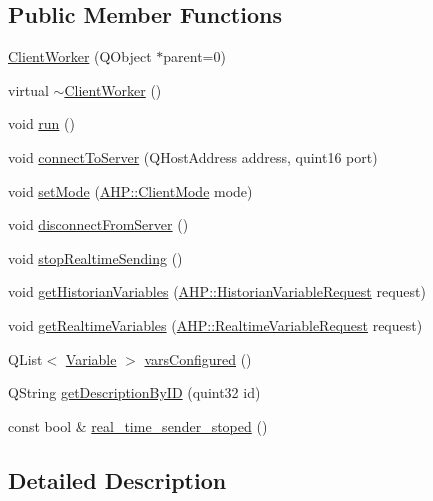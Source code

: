 \subsection*{Public Member Functions}
\begin{DoxyCompactItemize}
\item 
\hyperlink{class_client_worker_ad223b84d9ccc00853084642dbc4aa9af}{Client\+Worker} (Q\+Object $\ast$parent=0)
\item 
virtual \hyperlink{class_client_worker_a1660a6452f026a2885c6d282a0f5fa01}{$\sim$\+Client\+Worker} ()
\item 
void \hyperlink{class_client_worker_a70384799acf30a83743de2b68d942e58}{run} ()
\item 
void \hyperlink{class_client_worker_a9932072c09ca5961278629f0db6069d4}{connect\+To\+Server} (Q\+Host\+Address address, quint16 port)
\item 
void \hyperlink{class_client_worker_a98bac5e42243a0aa95ff67f2e7bd2edb}{set\+Mode} (\hyperlink{namespace_a_h_p_a130fcb3fee4e9ea58cc099ea76b62884}{A\+H\+P\+::\+Client\+Mode} mode)
\item 
void \hyperlink{class_client_worker_af23bbf2e8ea18946c39d61d2c93ced6b}{disconnect\+From\+Server} ()
\item 
void \hyperlink{class_client_worker_ad0f43610dc93ba270b945bace545dbbf}{stop\+Realtime\+Sending} ()
\item 
void \hyperlink{class_client_worker_add9dfbc8dafab0360a9a48496f86aec3}{get\+Historian\+Variables} (\hyperlink{class_a_h_p_1_1_historian_variable_request}{A\+H\+P\+::\+Historian\+Variable\+Request} request)
\item 
void \hyperlink{class_client_worker_af0493d89b0e047da671c76a7d1381853}{get\+Realtime\+Variables} (\hyperlink{class_a_h_p_1_1_realtime_variable_request}{A\+H\+P\+::\+Realtime\+Variable\+Request} request)
\item 
Q\+List$<$ \hyperlink{class_variable}{Variable} $>$ \hyperlink{class_client_worker_a36649bc07f2a824ea249413029da2e88}{vars\+Configured} ()
\item 
Q\+String \hyperlink{class_client_worker_abb6fe237f41d7720d0a150f593e69e0f}{get\+Description\+By\+I\+D} (quint32 id)
\item 
const bool \& \hyperlink{class_client_worker_af2afdbf21e66cb6fe593af04759f28e8}{real\+\_\+time\+\_\+sender\+\_\+stoped} ()
\end{DoxyCompactItemize}


\subsection{Detailed Description}


